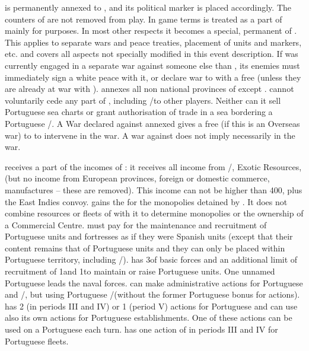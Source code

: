 
\phdipl
\aparag \paysPortugal is permanently annexed to \SPA, and its political marker
is placed accordingly. The counters of \paysPortugal are not removed from
play.
\aparag In game terms \paysPortugal is treated as a part of \SPA mainly for
\VP purposes.  In most other respects it becomes a special, permanent \VASSAL
of \SPA. This applies to separate wars and peace treaties, placement of units
and markers, etc. and covers all aspects not specially modified in this event
description.  If \paysPortugal was currently engaged in a separate war against
someone else than \SPA, its enemies must immediately sign a white peace with
it, or declare war to \SPA with a free \CB (unless they are already at war
with \SPA).
\aparag \SPA annexes all non national provinces of \paysPortugal except
\provinceAcores.
\aparag \SPA cannot voluntarily cede any part of \paysPortugal, including
\COL/\TP to other players. Neither can it sell Portuguese sea charts or grant
authorisation of trade in a sea bordering a Portuguese \COL/\TP.
\aparag A War declared against annexed \paysPortugal gives a free \CB (\OCB if
this is an Overseas war) to \SPA to intervene in the war.  A war against \SPA
does not imply necessarily \paysPortugal in the war.

\phadm
\aparag \SPA receives a part of the incomes of \paysPortugal: it receives all
income from \TP/\COL, Exotic Resources, \TradeFLEET (but no income from
European provinces, foreign or domestic commerce, manufactures -- these are
removed). This income can not be higher than 400\ducats, plus the East Indies
convoy.
\bparag \SPA gains the \PV for the monopolies detained by \paysPortugal. It
does not combine resources or fleets of \paysPortugal with it to determine
monopolies or the ownership of a Commercial Centre.
\aparag \SPA must pay for the maintenance and recruitment of Portuguese units
and fortresses as if they were Spanish units (except that their content
remains that of Portuguese units and they can only be placed within Portuguese
territory, including \COL/\TP).  \SPA has 3\GD of basic forces and an
additional limit of recruitment of 1\LD and 1\ND to maintain or raise
Portuguese units. One unnamed Portuguese \LeaderE leads the naval forces.
\aparag \SPA can make administrative actions for Portuguese \TradeFLEET and
\COL/\TP, but using Portuguese \FTI/\DTI (without the former Portuguese bonus
for \ROTW actions).  \SPA has 2 (in periods III and IV) or 1 (period V)
actions for Portuguese \COL and can use also its own actions for Portuguese
establishments. One of these actions can be used on a Portuguese \TP each
turn. \SPA has one action of \TradeFLEET in periods III and IV for Portuguese
fleets.

